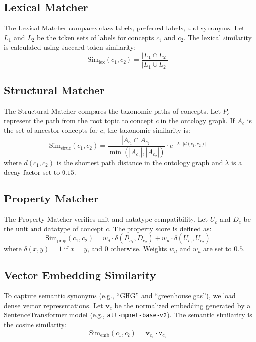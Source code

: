 \documentclass[journal,compsoc]{IEEEtran}
\begin{document}
\subsection{Lexical Matcher}
The Lexical Matcher compares class labels, preferred labels, and synonyms. Let $L_1$ and $L_2$ be the token sets of labels for concepts $c_1$ and $c_2$. The lexical similarity is calculated using Jaccard token similarity:
\begin{equation}
\text{Sim}_{\text{lex}}(c_1, c_2) = \frac{|L_1 \cap L_2|}{|L_1 \cup L_2|}
\end{equation}

\subsection{Structural Matcher}
The Structural Matcher compares the taxonomic paths of concepts. Let $P_{c}$ represent the path from the root topic to concept $c$ in the ontology graph. If $A_c$ is the set of ancestor concepts for $c$, the taxonomic similarity is:
\begin{equation}
\text{Sim}_{\text{struc}}(c_1, c_2) = \frac{|A_{c_1} \cap A_{c_2}|}{\min(|A_{c_1}|, |A_{c_2}|)} \cdot e^{-\lambda \cdot |d(c_1, c_2)|}
\end{equation}
where $d(c_1, c_2)$ is the shortest path distance in the ontology graph and $\lambda$ is a decay factor set to $0.15$.

\subsection{Property Matcher}
The Property Matcher verifies unit and datatype compatibility. Let $U_c$ and $D_c$ be the unit and datatype of concept $c$. The property score is defined as:
\begin{equation}
\text{Sim}_{\text{prop}}(c_1, c_2) = w_d \cdot \delta(D_{c_1}, D_{c_2}) + w_u \cdot \delta(U_{c_1}, U_{c_2})
\end{equation}
where $\delta(x, y) = 1$ if $x = y$, and $0$ otherwise. Weights $w_d$ and $w_u$ are set to $0.5$.

\subsection{Vector Embedding Similarity}
To capture semantic synonyms (e.g., ``GHG'' and ``greenhouse gas''), we load dense vector representations. Let $\mathbf{v}_{c}$ be the normalized embedding generated by a SentenceTransformer model (e.g., \texttt{all-mpnet-base-v2}). The semantic similarity is the cosine similarity:
\begin{equation}
\text{Sim}_{\text{emb}}(c_1, c_2) = \mathbf{v}_{c_1} \cdot \mathbf{v}_{c_2}
\end{equation}
\end{document}
